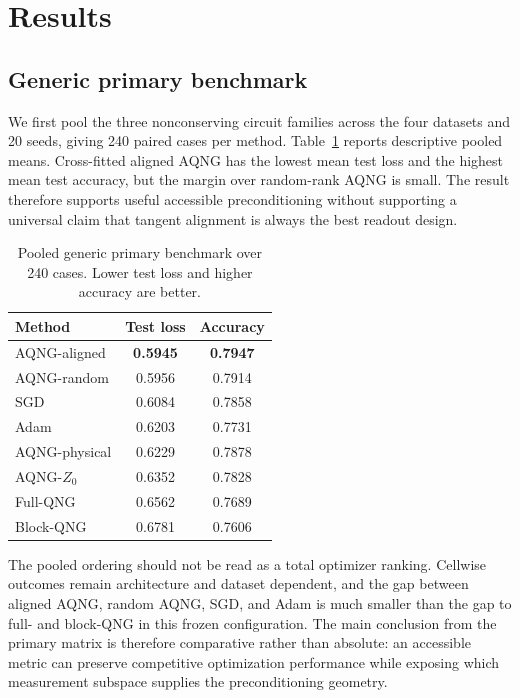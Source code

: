 \section{Results}

\subsection{Generic primary benchmark}
We first pool the three nonconserving circuit families across the four datasets and 20 seeds, giving 240 paired cases per method. Table~\ref{tab:generic} reports descriptive pooled means. Cross-fitted aligned AQNG has the lowest mean test loss and the highest mean test accuracy, but the margin over random-rank AQNG is small. The result therefore supports useful accessible preconditioning without supporting a universal claim that tangent alignment is always the best readout design.

\begin{table}[t]
\centering
\caption{Pooled generic primary benchmark over 240 cases. Lower test loss and higher accuracy are better.}
\label{tab:generic}
\begin{tabular}{lcc}
\toprule
Method & Test loss & Accuracy \\
\midrule
AQNG-aligned  & \textbf{0.5945} & \textbf{0.7947} \\
AQNG-random   & 0.5956 & 0.7914 \\
SGD           & 0.6084 & 0.7858 \\
Adam          & 0.6203 & 0.7731 \\
AQNG-physical & 0.6229 & 0.7878 \\
AQNG-$Z_0$    & 0.6352 & 0.7828 \\
Full-QNG      & 0.6562 & 0.7689 \\
Block-QNG     & 0.6781 & 0.7606 \\
\bottomrule
\end{tabular}
\end{table}

The pooled ordering should not be read as a total optimizer ranking. Cellwise outcomes remain architecture and dataset dependent, and the gap between aligned AQNG, random AQNG, SGD, and Adam is much smaller than the gap to full- and block-QNG in this frozen configuration. The main conclusion from the primary matrix is therefore comparative rather than absolute: an accessible metric can preserve competitive optimization performance while exposing which measurement subspace supplies the preconditioning geometry.

